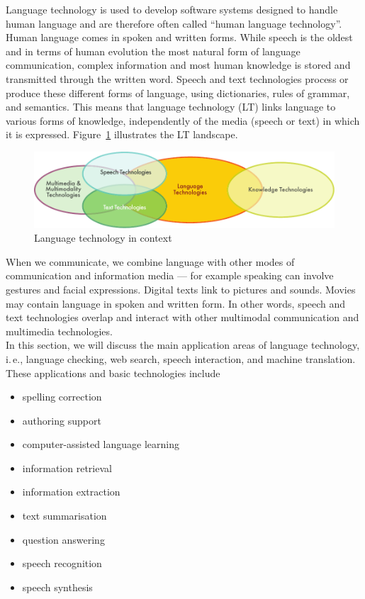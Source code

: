 \documentclass[]{../metanetpaper}
\begin{document}

\begin{multicols}{2}

Language technology is used to develop software systems designed to
handle human language and are therefore often called ``human language
technology''. Human language comes in spoken and written forms. While
speech is the oldest and in terms of human evolution the most natural
form of language communication, complex information and most human
knowledge is stored and transmitted through the written word. Speech
and text technologies process or produce these different forms of
language, using dictionaries, rules of grammar, and semantics. This
means that language technology (LT) links language to various forms of
knowledge, independently of the media (speech or text) in which it is
expressed. Figure~\ref{fig:ltincontext_en} illustrates the LT
landscape. 

\begin{figure}[htb]
  \center
  \includegraphics[width=\textwidth]{../_media/english/language_technologies}
  \caption{Language technology in context}
  \label{fig:ltincontext_en}
\end{figure}

When we communicate, we combine language with other modes of communication and information media --- for example speaking can involve gestures and facial expressions. Digital texts link to pictures and sounds. Movies may contain language in spoken and written form. In other words, speech and text technologies overlap and interact with other multimodal communication and multimedia technologies.\\ 
In this section, we will discuss the main application areas of language technology, i.\,e., language checking, web search, speech interaction, and machine translation. These applications and basic technologies include 

\begin{itemize}
\item spelling correction
\item authoring support
\item computer-assisted language learning
\item information retrieval 
\item information extraction
\item text summarisation
\item question answering
\item speech recognition 
\item speech synthesis 
\end{itemize}


\end{multicols}
\end{document}
